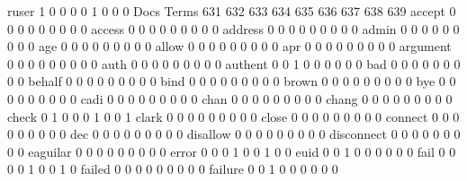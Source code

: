 \documentclass[compress,8pt]{beamer}
\begin{document}
\begin{frame}
\begin{Schunk}
  ruser                                      1   0   0   0   0   1   0   0   0
                                          Docs
Terms                                      631 632 633 634 635 636 637 638 639
  accept                                     0   0   0   0   0   0   0   0   0
  access                                     0   0   0   0   0   0   0   0   0
  address                                    0   0   0   0   0   0   0   0   0
  admin                                      0   0   0   0   0   0   0   0   0
  age                                        0   0   0   0   0   0   0   0   0
  allow                                      0   0   0   0   0   0   0   0   0
  apr                                        0   0   0   0   0   0   0   0   0
  argument                                   0   0   0   0   0   0   0   0   0
  auth                                       0   0   0   0   0   0   0   0   0
  authent                                    0   0   1   0   0   0   0   0   0
  bad                                        0   0   0   0   0   0   0   0   0
  behalf                                     0   0   0   0   0   0   0   0   0
  bind                                       0   0   0   0   0   0   0   0   0
  brown                                      0   0   0   0   0   0   0   0   0
  bye                                        0   0   0   0   0   0   0   0   0
  cadi                                       0   0   0   0   0   0   0   0   0
  chan                                       0   0   0   0   0   0   0   0   0
  chang                                      0   0   0   0   0   0   0   0   0
  check                                      0   1   0   0   0   1   0   0   1
  clark                                      0   0   0   0   0   0   0   0   0
  close                                      0   0   0   0   0   0   0   0   0
  connect                                    0   0   0   0   0   0   0   0   0
  dec                                        0   0   0   0   0   0   0   0   0
  disallow                                   0   0   0   0   0   0   0   0   0
  disconnect                                 0   0   0   0   0   0   0   0   0
  eaguilar                                   0   0   0   0   0   0   0   0   0
  error                                      0   0   0   1   0   0   1   0   0
  euid                                       0   0   1   0   0   0   0   0   0
  fail                                       0   0   0   0   1   0   0   1   0
  failed                                     0   0   0   0   0   0   0   0   0
  failure                                    0   0   1   0   0   0   0   0   0

\end{Schunk}
\end{frame}
\end{document}

